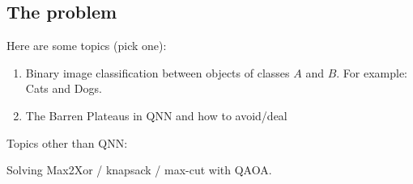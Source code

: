\subsection{The problem}
Here are some topics (pick one):
\begin{enumerate}
    \item Binary image classification between objects of classes $A$ and $B$. For example: Cats and Dogs.
    \item The Barren Plateaus in QNN and how to avoid/deal
\end{enumerate}

Topics other than QNN:

Solving Max2Xor / knapsack / max-cut with QAOA.